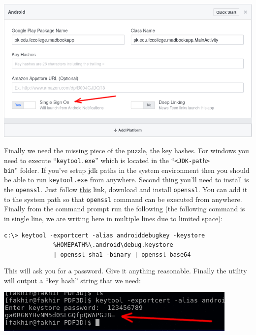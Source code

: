 \begin{center}
	\includegraphics[scale=\SourceCodeScale]{chapters/ch12/images/6}
\end{center}

Finally we need the missing piece of the puzzle, the key hashes. For windows you need to execute ``\texttt{keytool.exe}'' which is located in the ``\texttt{<JDK-path>\\bin}'' folder. If you've setup jdk paths in the system environment then you should be able to run \texttt{keytool.exe} from anywhere. Second thing you'll need to install is the \texttt{openssl}. Just follow \href{https://sourceforge.net/projects/openssl/}{this} link, download and install \texttt{openssl}. You can add it to the system path so that \texttt{openssl} command can be executed from anywhere. Finally from the command prompt run the following (the following command is in single line, we are writing here in multiple lines due to limited space): 

\begin{verbatim}
c:\> keytool -exportcert -alias androiddebugkey -keystore
              %HOMEPATH%\.android\debug.keystore 
              | openssl sha1 -binary | openssl base64
\end{verbatim}

This will ask you for a password. Give it anything reasonable. Finally the utility will output a ``key hash'' string that we need:

\begin{center}
	\includegraphics[scale=\SourceCodeScale]{chapters/ch12/images/7}
\end{center}

